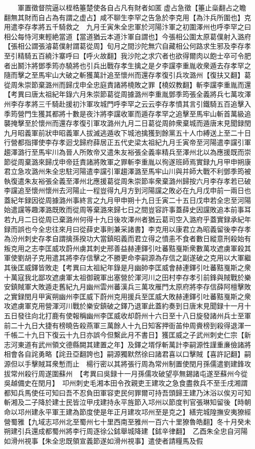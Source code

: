 　　軍置徵督院逼以桎梏箠楚使各自占凡有財者如匿虚占急徵【箠止橤翻占之瞻翻無其財而自占為有謂之虚占】咸不聊生李罕之告急於李克用【為汴兵所圍也】克用遣李存孝將五千騎救之　九月壬寅朱全忠軍於河陽汴軍之初圍澤州也呼李罕之曰相公每恃河東輕絶當道【當道猶云本道汴軍自謂也】今張相公圍太原葛僕射入潞府【張相公謂張濬葛僕射謂葛從周】旬月之間沙陀無穴自藏相公何路求生邪及李存孝至引精騎五百繞汴寨呼曰【呼火故翻】我沙陀之求穴者也欲得爾肉以飽士卒可令肥者出鬭汴將鄧季筠亦驍將也引兵出戰存孝生擒之是夕李讜李重胤收衆遁去存孝罕之隨而擊之至馬牢山大破之斬獲萬計追至懷州而還存孝復引兵攻潞州【復扶又翻】葛從周朱崇節棄潞州而歸戊申全忠庭責諸將橈敗之罪【橈奴教翻】斬李讜李重胤而還　【考異曰唐太祖紀年錄六月朱崇節葛從周據潞州李重胤鄧季筠張全義將兵七萬攻澤州李存孝將三千騎赴援初汴軍攻城門呼李罕之云云李存孝憤其言引鐵騎五百追擊入季筠營門生獲其都將十數是夜汴將李讜收軍而遁存孝罕之追擊至馬牢山斬首萬級追襲掩擊至於懷州而還存孝復引軍攻潞州九月二日葛從周帥衆棄城而遁唐末見聞録閏九月昭義軍前狀申昭義軍人拔滅逃遁收下城池擒獲到餘黨五十人巾縛送上至二十日行營都指揮使李存孝迴戈歸府薛居正五代史梁太祖紀九月壬寅帝至河陽遣李讜引軍趨澤潞行至馬牢川為晉人所敗帝又遣朱友裕張全義率精兵至澤州北以為應援既而崇節從周棄潞來歸戊申帝廷責諸將敗軍之罪斬李重胤以徇遂班師焉實録九月甲申朔康君立急攻潞州朱全忠駐河陽遣李讜引軍趨澤潞至馬牢山川與并師大戰不利鄧季筠被執復遣朱友裕張全義至澤州北應援葛從周朱崇節率衆棄潞州歸按六月李存孝若已破李讜追至懷州懷州去河陽止一程豈得九月方到河陽讜之敗必在九月戊申前一兩日也蓋紀年録因從周據潞州事終言之九月甲申朔十九日壬寅二十五日戊申若全忠至河陽始遣讜等趣澤潞既敗而從周等棄潞來歸七日之間豈容許事蓋薛史因讜敗追本前事耳若九月二日從周已棄潞州何得十九日後攻澤州者猶云葛司空入潞府乎蓋實録承紀年録而誤也今全忠往來月曰從薛史事則兼采諸書】李克用以康君立為昭義留後李存孝為汾州刺史存孝自謂擒孫揆功大當鎮昭義而君立得之憤恚不食者數日縱意刑殺始有叛克用之志李匡威攻蔚州虜其刺史邢善益赫連鐸引吐蕃黠戛斯衆數萬攻遮虜軍殺其軍使劉胡子克用遣其將李存信擊之不勝更命李嗣源為存信之副遂破之克用以大軍繼其後匡威鐸皆敗走【考異曰太祖紀年錄是月幽帥李匡威會赫連鐸引吐蕃黠戛斯之衆十萬寇我北鄙攻遮虜軍太祖御親軍出塞營於渾河川之田村李存孝引前鋒與賊戰於樂安鎮賊軍大敗遁走舊紀九月幽州雲州蕃漢兵三萬攻雁門太原府將李存信薛阿檀擊敗之實録閏月甲寅朔幽州李匡威下蔚州克用援兵至匡威大敗赫連鐸引吐蕃黠戛斯之衆攻遮虜軍克用營渾河川戰於樂安鎮破之鐸乃退軍此蓋約奏到日唐末見聞録十一月十五日發往向北打鹿有使報稱幽州李匡威收却蔚州十六日至十八日旋發諸州兵士至軍前二十九日大捷有榜曉告殺燕軍三萬餘人十九日知客押衙苖仲周賫榜到殺得退渾一千帳二十九日下復云十九日亦誤今但繫此月不書日】獲匡威之子武州刺史仁宗【新志河東道有武州領文德縣闕其建置之年】及鐸之壻俘斬萬計李嗣源性謹重亷儉諸將相會各自詫勇略【詫丑亞翻誇也】嗣源獨默然徐曰諸君喜以口擊賊【喜許記翻】嗣源但以手擊賊耳衆慙而止　楊行密以其將張行周為常州制置使閏月孫儒遣劉建鋒攻拔常州殺行周遂圍蘇州　【考異曰吳録十一月孫儒攻破望亭無錫諸屯遂至蘇州今從吳越備史在閏月】　卭州刺史毛湘本田令孜親吏王建攻之急食盡救兵不至壬戌湘謂都知兵馬使任可知曰吾不忍負田軍容吏民何罪爾可持吾頭歸王建乃沐浴以俟刃可知斬湘及二子降於建士民皆泣甲戌建持永平旌節入邛州以節度判官張琳知留後【時朝命以邛州建永平軍王建為節度使是年正月建攻邛州至是克之】繕完城隍撫安夷獠經營蜀雅【九域志邛州北至蜀州七十里西南至雅州一百六十里獠魯皓翻】冬十月癸未朔建引兵還成都蜀州將李行周逐徐公鉥舉城降建【鉥辛律翻】　乙酉朱全忠自河陽如滑州視事【朱全忠既領宣義節遂如滑州視事】遣使者請糧馬及假